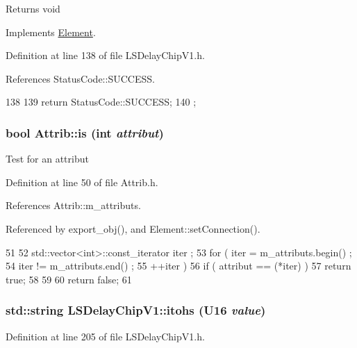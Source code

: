 \begin{DoxyReturn}{Returns}
void 
\end{DoxyReturn}


Implements \hyperlink{classElement_af42754b5cabc198869222725218d695c}{Element}.

Definition at line 138 of file LSDelayChipV1.h.

References StatusCode::SUCCESS.


\begin{DoxyCode}
138                     {
139     return StatusCode::SUCCESS;
140   };
\end{DoxyCode}
\hypertarget{classAttrib_a704f26af560909ad22065083bb7d4c34}{
\subsubsection[{is}]{\setlength{\rightskip}{0pt plus 5cm}bool Attrib::is (int {\em attribut})}}
\label{classAttrib_a704f26af560909ad22065083bb7d4c34}
Test for an attribut 

Definition at line 50 of file Attrib.h.

References Attrib::m\_\-attributs.

Referenced by export\_\-obj(), and Element::setConnection().


\begin{DoxyCode}
51   {
52     std::vector<int>::const_iterator iter ;
53     for ( iter  = m_attributs.begin() ;
54           iter != m_attributs.end()   ;
55           ++iter ) {
56       if ( attribut == (*iter) ) {
57         return true;
58       }
59     }
60     return false;
61   }
\end{DoxyCode}
\hypertarget{classLSDelayChipV1_af7f4d72fb404b6b3d7b41fd01876ed0a}{
\subsubsection[{itohs}]{\setlength{\rightskip}{0pt plus 5cm}std::string LSDelayChipV1::itohs ({\bf U16} {\em value})}}
\label{classLSDelayChipV1_af7f4d72fb404b6b3d7b41fd01876ed0a}


Definition at line 205 of file LSDelayChipV1.h.

